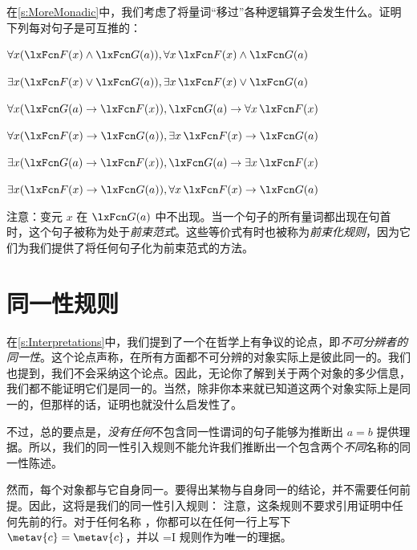 \problempart
在\cref{s:MoreMonadic}中，我们考虑了将量词“移过”各种逻辑算子会发生什么。证明下列每对句子是可互推的：

\begin{compactlist}
\item $\forall x(\atom{F}{x} \eand \atom{G}{a}), \forall x\,\atom{F}{x} \eand \atom{G}{a}$
\item $\exists x(\atom{F}{x} \eor \atom{G}{a}), \exists x\,\atom{F}{x} \eor \atom{G}{a}$
\item $\forall x(\atom{G}{a} \eif \atom{F}{x}), \atom{G}{a} \eif \forall x\,\atom{F}{x}$
\item $\forall x(\atom{F}{x} \eif \atom{G}{a}), \exists x\,\atom{F}{x} \eif \atom{G}{a}$
\item $\exists x(\atom{G}{a} \eif \atom{F}{x}), \atom{G}{a} \eif \exists x\,\atom{F}{x}$
\item $\exists x(\atom{F}{x} \eif \atom{G}{a}), \forall x\,\atom{F}{x} \eif \atom{G}{a}$
\end{compactlist}

注意：变元 $x$ 在 $\atom{G}{a}$ 中不出现。当一个句子的所有量词都出现在句首时，这个句子被称为处于\emph{前束范式}。这些等价式有时也被称为\emph{前束化规则}，因为它们为我们提供了将任何句子化为前束范式的方法。

\chapter{同一性规则}
在\cref{s:Interpretations}中，我们提到了一个在哲学上有争议的论点，即\emph{不可分辨者的同一性}。这个论点声称，在所有方面都不可分辨的对象实际上是彼此同一的。我们也提到，我们不会采纳这个论点。因此，无论你了解到关于两个对象的多少信息，我们都不能证明它们是同一的。当然，除非你本来就已知道这两个对象实际上是同一的，但那样的话，证明也就没什么启发性了。

不过，总的要点是，\emph{没有任何}不包含同一性谓词的句子能够为推断出 $a=b$ 提供理据。所以，我们的同一性引入规则不能允许我们推断出一个包含两个\emph{不同}名称的同一性陈述。

然而，每个对象都与它自身同一。要得出某物与自身同一的结论，并不需要任何前提。因此，这将是我们的同一性引入规则：
注意，这条规则不要求引用证明中任何先前的行。对于任何名称 ，你都可以在任何一行上写下 $\metav{c}=\metav{c}$，并以 {=}I 规则作为唯一的理据。

